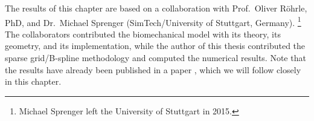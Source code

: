The results of this chapter are based on a collaboration with
Prof.\ Oliver Röhrle, PhD, and Dr.\ Michael Sprenger
(SimTech/University of Stuttgart, Germany).%
\footnote{%
  Michael Sprenger left the University of Stuttgart in 2015.%
}
The collaborators contributed the biomechanical model
with its theory, its geometry, and its implementation,
while the author of this thesis contributed the
sparse grid/B-spline methodology and
computed the numerical results.
Note that the results have already been
published in a paper \cite{Valentin18Gradient},
which we will follow closely in this chapter.





\cleardoublepage
